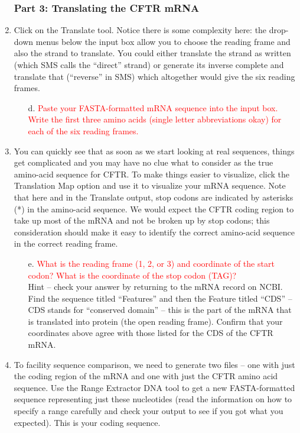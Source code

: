 \begin{enumerate}
	\subsubsection*{Part 3: Translating the CFTR mRNA}
	\item Click on the Translate tool.  Notice there is some complexity here:  the drop-down menus below the input box allow you to choose the reading frame and also the strand to translate.  You could either translate the strand as written (which SMS calls the ``direct'' strand) or generate its inverse complete and translate that (``reverse'' in SMS) which altogether would give the six reading frames. 
	\begin{itemize}
		\item[d.] \textcolor{red}{Paste your FASTA-formatted mRNA sequence into the input box.  Write the first three amino acids (single letter abbreviations okay) for each of the six reading frames. }
	\end{itemize}
	\item You can quickly see that as soon as we start looking at real sequences, things get complicated and you may have no clue what to consider as the true amino-acid sequence for CFTR.  To make things easier to visualize, click the Translation Map option and use it to visualize your mRNA sequence.
Note that here and in the Translate output, stop codons are indicated by asterisks (*) in the amino-acid sequence.  We would expect the CFTR coding region to take up most of the mRNA and not be broken up by stop codons; this consideration should make it easy to identify the correct amino-acid sequence in the correct reading frame. 
	\begin{itemize}
		\item[e.] \textcolor{red}{What is the reading frame (1, 2, or 3) and coordinate of the start codon?  What is the coordinate of the stop codon (TAG)?} \\
		
Hint – check your answer by returning to the mRNA record on NCBI.  Find the sequence titled ``Features'' and then the Feature titled ``CDS'' – CDS stands for ``conserved domain'' – this is the part of the mRNA that is translated into protein (the open reading frame).  Confirm that your coordinates above agree with those listed for the CDS of the CFTR mRNA.
	\end{itemize}
	\item To facility sequence comparison, we need to generate two files – one with just the coding region of the mRNA and one with just the CFTR amino acid sequence.  Use the Range Extractor DNA tool to get a new FASTA-formatted sequence representing just these nucleotides (read the information on how to specify a range carefully and check your output to see if you got what you expected).   This is your coding sequence. \\
	

\end{enumerate}
